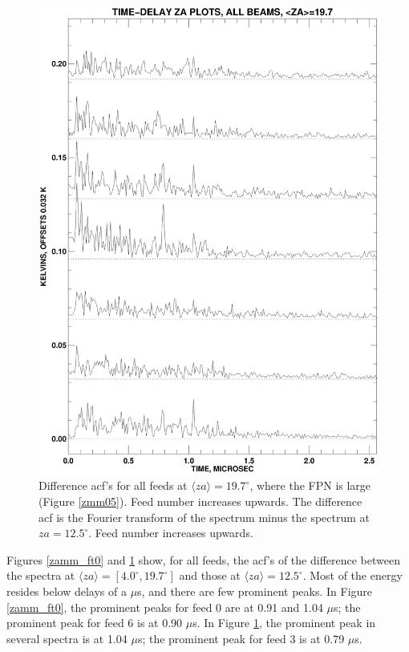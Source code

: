 \documentclass[psfig,preprint]{aastex}
\begin{document}
\begin{figure}[!p]
\begin{center}
\includegraphics[width=6in]{zammplot_ft6.ps}   
\end{center}
\caption{Difference acf's for all feeds at $\langle za
\rangle=19.7^\circ$, where the FPN is large (Figure \ref{zmm05}).  Feed
number increases upwards.  The difference acf is the Fourier transform
of the spectrum minus the spectrum at $za = 12.5^\circ$.  Feed number
increases upwards.  \label{zamm_ft6}}
\end{figure}

	Figures \ref{zamm_ft0} and \ref{zamm_ft6} show, for all feeds,
the acf's of the difference between the spectra at $\langle za
\rangle=[4.0^\circ, 19.7^\circ]$ and those at $\langle za \rangle =
12.5^\circ$.  Most of the energy resides below delays of a $\mu$s, and
there are few prominent peaks.  In Figure \ref{zamm_ft0}, the prominent
peaks for feed 0 are at 0.91 and 1.04 $\mu$s; the prominent peak for
feed 6 is at 0.90 $\mu$s.  In Figure \ref{zamm_ft6}, the prominent peak
in several spectra is at 1.04 $\mu$s; the prominent peak for feed 3 is
at 0.79 $\mu$s. 
\end{document}
